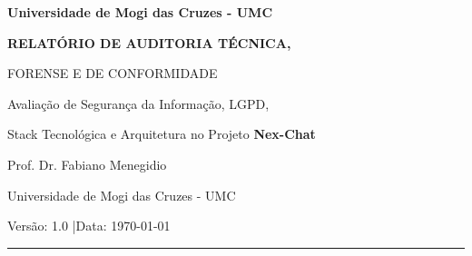 \documentclass[11pt, a4paper]{article}
\begin{document}

\begin{titlepage}
  \centering
  \vspace*{2cm}
  {\Large\bfseries Universidade de Mogi das Cruzes - UMC \par}
  \vspace{1cm}
  {\LARGE\bfseries RELATÓRIO DE AUDITORIA TÉCNICA,\par
                   FORENSE E DE CONFORMIDADE \par}
  \vspace{0.5cm}
  {\large Avaliação de Segurança da Informação, LGPD,\par
           Stack Tecnológica e Arquitetura no Projeto \textbf{Nex-Chat} \par}
  \vspace{2cm}
  {\large Prof. Dr. Fabiano Menegidio \par}
  \vspace{0.3cm}
  {\normalsize Universidade de Mogi das Cruzes - UMC \par}
  \vspace{1.5cm}
  {\normalsize Versão: 1.0 \quad|\quad Data: \today \par}
  \vspace{1cm}
  \rule{16cm}{0.5pt}
  \vspace{0.5cm}

  \begin{abstract}
    \noindent O presente relatório apresenta os resultados de uma auditoria técnica, forense e de
    conformidade conduzida sobre o projeto \textbf{Nex-Chat}, uma plataforma de atendimento via
    WhatsApp com automação de chatbot, gestão de operadores e integrações de pagamento. A auditoria
    foi realizada segundo os princípios da norma \textbf{ABNT NBR ISO/IEC 27001:2022} e da
    \textbf{Lei Geral de Proteção de Dados} (Lei nº 13.709/2018 - LGPD), abrangendo a análise da
    robustez arquitetural, segurança da stack tecnológica (Node.js/Express/React), modelagem de
    ameaças, e verificação de conformidade regulatória. Foram identificados riscos relacionados à
    ausência histórica de mecanismos formais de autenticação (pré-implementação do módulo
    \texttt{auth.mjs}), ausência de 2FA e inexistência de logs de auditoria estruturados. As
    remediações foram implementadas diretamente no repositório, incluindo hash bcrypt (custo 12),
    sessões JWT com expiração e blacklist, 2FA TOTP (RFC 6238), proteção contra força bruta,
    recuperação segura de senha e endpoints de conformidade LGPD. O parecer final indica que o
    projeto, após as remediações aplicadas, apresenta arquitetura apta para homologação em
    ambiente de produção com os devidos controles de monitoramento contínuo.
  \end{abstract}
\end{titlepage}
\end{document}
